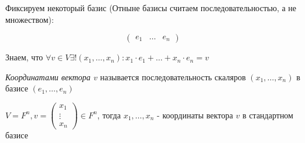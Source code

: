Фиксируем некоторый базис (Отныне базисы считаем последовательностью, а не множеством):


$$\begin{pmatrix}
    e_1 & \dots & e_n
\end{pmatrix}$$


Знаем, что $\forall v \in V \exists! (x_1, \dots, x_n): x_1 \cdot e_1 + \dots + x_n \cdot e_n = v$


\begin{definition}

    \textit{Координатами вектора $v$} называется последовательность скаляров $(x_1, \dots, x_n)$ в базисе $(e_1, \dots, e_n)$

    \begin{example}

        $V = F^n, v = \begin{pmatrix}
            x_1 \\ \vdots \\ x_n
        \end{pmatrix} \in F^n$, тогда $x_1, \dots, x_n$ - координаты вектора $v$ в стандартном базисе

    \end{example}
    
\end{definition}


\bigskip



